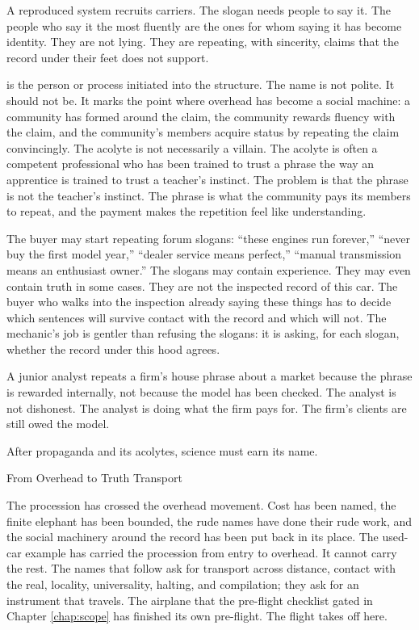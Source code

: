 A reproduced system recruits carriers. The slogan needs people to say
it. The people who say it the most fluently are the ones for whom
saying it has become identity. They are not lying. They are repeating,
with sincerity, claims that the record under their feet does not
support.

 is the person or process initiated into the structure.
The name is not polite. It should not be. It marks the point where
overhead has become a social machine: a community has formed around
the claim, the community rewards fluency with the claim, and the
community's members acquire status by repeating the claim
convincingly. The acolyte is not necessarily a villain. The acolyte is
often a competent professional who has been trained to trust a phrase
the way an apprentice is trained to trust a teacher's instinct. The
problem is that the phrase is not the teacher's instinct. The phrase
is what the community pays its members to repeat, and the payment
makes the repetition feel like understanding.

The buyer may start repeating forum slogans: ``these engines run
forever,'' ``never buy the first model year,'' ``dealer service means
perfect,'' ``manual transmission means an enthusiast owner.'' The
slogans may contain experience. They may even contain truth in some
cases. They are not the inspected record of this car. The buyer who
walks into the inspection already saying these things has to decide
which sentences will survive contact with the record and which will
not. The mechanic's job is gentler than refusing the slogans: it is
asking, for each slogan, whether the record under this hood agrees.

A junior analyst repeats a firm's house phrase about a market because
the phrase is rewarded internally, not because the model has been
checked. The analyst is not dishonest. The analyst is doing what the
firm pays for. The firm's clients are still owed the model.

After propaganda and its acolytes, science must earn its name.

\begin{movement}{From Overhead to Truth Transport}

The procession has crossed the overhead movement. Cost has been named,
the finite elephant has been bounded, the rude names have done their
rude work, and the social machinery around the record has been put
back in its place. The used-car example has carried the procession
from entry to overhead. It cannot carry the rest. The names that
follow ask for transport across distance, contact with the real,
locality, universality, halting, and compilation; they ask for an
instrument that travels. The airplane that the pre-flight checklist
gated in Chapter \ref{chap:scope} has finished its own pre-flight.
The flight takes off here.

\end{movement}

